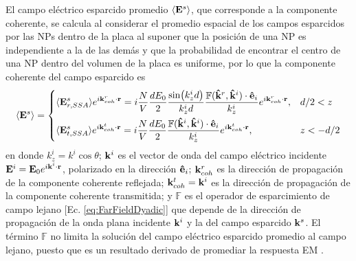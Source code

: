 El  campo eléctrico esparcido promedio $\langle \vb{E}^s\rangle$, que corresponde a la componente coherente, se calcula al considerar el promedio espacial de los campos esparcidos por las NPs dentro de la placa al suponer que la posición de una NP es independiente a la de las demás y que la probabilidad de encontrar el centro de una NP dentro del volumen de la placa es uniforme, por lo que la componente coherente del campo esparcido es  \cite{garcia2012multiple}
%
	\begin{align}
	\langle \vb{E}^s\rangle =
	\begin{dcases} 
	      \langle \vb{E}^s_{r,SSA}\rangle e^{i\vb{k}^r_{coh}\cdot\vb{r}} =
	    			i \frac{N}{V}  \frac{d E_0}{2} \frac{\sin(k_z^id)}{k_z^i d} 
				\frac{\mathbb{F}(\vu{k}^r,\vu{k}^i)\cdot \vu{e}_i}{k_z^i }	e^{i\vb{k}^r_{coh}\cdot\vb{r}},		& d/2<z \\
      \langle \vb{E}^s_{t,SSA}\rangle e^{i\vb{k}^t_{coh}\cdot\vb{r}} =
 				i\frac{N}{V} \frac{d E_0}{2}\frac{\mathbb{F}(\vu{k}^i,\vu{k}^i)\cdot \vu{e}_i}{k_z^i}		
				e^{i\vb{k}^t_{coh}\cdot\vb{r}},
							& z<-d/2
   \end{dcases}
   	\label{eq:AvErEt}
	\end{align}
%
en donde $k^i_z = k^i\cos\theta$; $\vb{k}^i$ es el vector de onda del campo eléctrico incidente $\vb{E}^i = \vb{E}_0 e^{i\vb{k}^i\cdot\vb{r}}$, polarizado en la dirección $\vu{e}_i$; $\vb{k}^r_{coh}$ es la dirección de propagación de la componente coherente reflejada; $\vb{k}^t_{coh}=\vb{k}^i$ es la dirección de propagación de la componente coherente transmitida; y $\mathbb{F}$  es el operador de esparcimiento de campo lejano [Ec. \eqref{eq:FarFieldDyadic}] que depende de la dirección de propagación de la onda plana incidente $\vb{k}^i$ y la del campo esparcido $\vb{k}^s$. El término $\mathbb{F}$ no limita la solución del campo eléctrico esparcido promedio al campo lejano, puesto que es un resultado derivado de promediar la respuesta EM \cite{gutierrez2012overview}.

